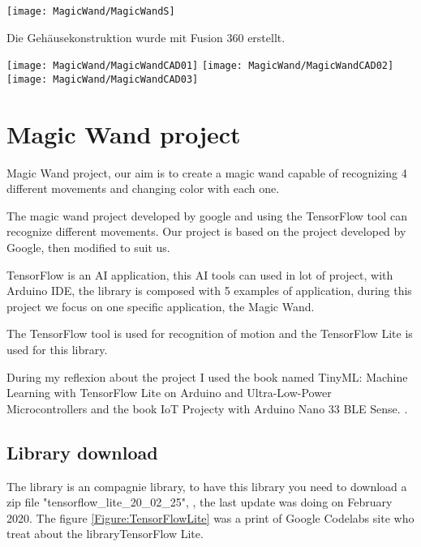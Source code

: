 \texttt{[image: MagicWand/MagicWandS]}

\bigskip

Die Gehäusekonstruktion wurde mit Fusion 360 erstellt.

\bigskip

\texttt{[image: MagicWand/MagicWandCAD01]}
\texttt{[image: MagicWand/MagicWandCAD02]}
\texttt{[image: MagicWand/MagicWandCAD03]}

\bigskip

{
}


{
}


\chapter{Magic Wand project}

Magic Wand project, our aim is to create a magic wand capable of recognizing 4 different movements and changing color with each one. 

The magic wand project developed by google and using the TensorFlow tool can recognize different movements. Our project is based on the project developed by Google, then modified to suit us. 

TensorFlow is an AI application, this AI tools can used in lot of project, with Arduino IDE, the library  is composed with 5 examples of application, during this project we focus on one specific application, the Magic Wand.

The TensorFlow tool is used for recognition of motion and the TensorFlow Lite is used for this library. 

During my reflexion about the project I used the book named TinyML: Machine Learning with TensorFlow Lite on Arduino and Ultra-Low-Power Microcontrollers \cite{Warden:2020} and the book IoT Projecty with Arduino Nano 33 BLE Sense. \cite{Kurniawan:2021b}.

\section{Library download}

The library  is an compagnie library, to have this library you need to download a zip file "tensorflow\_lite\_20\_02\_25", \cite{GoogleTensorFlow:2019}, the last update was doing on February 2020.  The figure \ref{Figure:TensorFlowLite} was a print of Google Codelabs site who treat about the libraryTensorFlow Lite.

